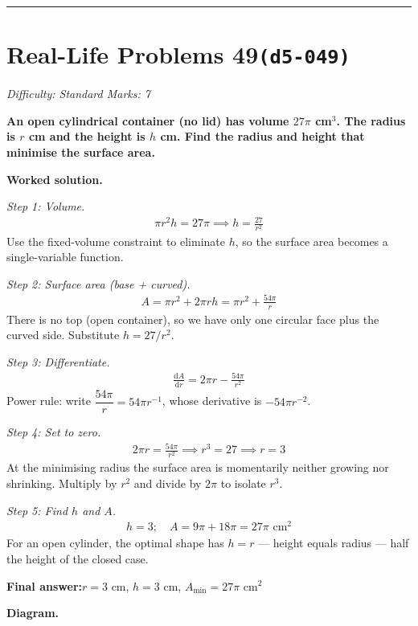 \documentclass[11pt]{article}
\newcommand{\question}[1]{\par\medskip\noindent\textbf{#1}\par}
\begin{document}
\medskip\hrule

\section*{Real-Life Problems 49\quad\small\texttt{(d5-049)}}
\textit{Difficulty: Standard \quad\textbar\quad Marks: 7}

\question{An open cylindrical container (no lid) has volume \( 27\pi \) cm\(^3\). The radius is \( r \) cm and the height is \( h \) cm. Find the radius and height that minimise the surface area.}

\textbf{Worked solution.}

\textit{Step 1: Volume.}
\[\begin{gathered}
\pi r^2 h = 27\pi \implies h = \frac{27}{r^2}
\end{gathered}\]
Use the fixed-volume constraint to eliminate \( h \), so the surface area becomes a single-variable function.

\textit{Step 2: Surface area (base + curved).}
\[\begin{gathered}
A = \pi r^2 + 2\pi r h = \pi r^2 + \frac{54\pi}{r}
\end{gathered}\]
There is no top (open container), so we have only one circular face plus the curved side. Substitute \( h = 27/r^2 \).

\textit{Step 3: Differentiate.}
\[\begin{gathered}
\frac{\mathrm{d}A}{\mathrm{d}r} = 2\pi r - \frac{54\pi}{r^2}
\end{gathered}\]
Power rule: write \( \dfrac{54\pi}{r} = 54\pi r^{-1} \), whose derivative is \( -54\pi r^{-2} \).

\textit{Step 4: Set to zero.}
\[\begin{gathered}
2\pi r = \frac{54\pi}{r^2} \implies r^3 = 27 \implies r = 3
\end{gathered}\]
At the minimising radius the surface area is momentarily neither growing nor shrinking. Multiply by \( r^2 \) and divide by \( 2\pi \) to isolate \( r^3 \).

\textit{Step 5: Find \( h \) and \( A \).}
\[\begin{gathered}
h = 3; \quad A = 9\pi + 18\pi = 27\pi \text{ cm}^2
\end{gathered}\]
For an open cylinder, the optimal shape has \( h = r \) --- height equals radius --- half the height of the closed case.

\begin{answerbox}
\textbf{Final answer:}\quad \(\displaystyle  r = 3 \) cm, \(\displaystyle  h = 3 \) cm, \(\displaystyle  A_{\min} = 27\pi \text{ cm}^2 \)
\end{answerbox}
\textbf{Diagram.}
\end{document}
